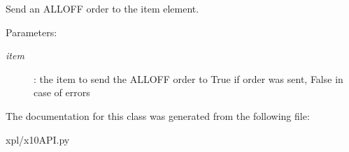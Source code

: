 Send an ALLOFF order to the item element. 

\begin{Desc}
\item[Parameters:]
\begin{description}
\item[{\em item}]: the item to send the ALLOFF order to  True if order was sent, False in case of errors \end{description}
\end{Desc}


The documentation for this class was generated from the following file:\begin{CompactItemize}
\item 
xpl/x10API.py\end{CompactItemize}
